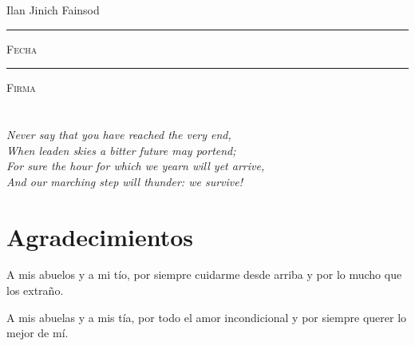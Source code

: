 \documentclass[11pt, oneside]{book}
\begin{document}
\centering

\hspace{3em}

Ilan Jinich Fainsod

\vspace{5em}

\rule[1em]{20em}{0.5pt} %

\textsc{Fecha}
 
\vspace{8em}

\rule[1em]{20em}{0.5pt} %

\textsc{Firma}

\endgroup
\vspace*{\fill}



\pagestyle{empty}
\frontmatter

\chapter*{}
\begin{flushright}
\textit{ Never say that you have reached the very end, \\
When leaden skies a bitter future may portend; \\
For sure the hour for which we yearn will yet arrive, \\
And our marching step will thunder: we survive!}
\end{flushright}



\chapter*{Agradecimientos}
%
A mis abuelos y a mi tío, por siempre cuidarme desde arriba y por lo mucho que los extraño.

A mis abuelas y a mis tía, por todo el amor incondicional y por siempre querer lo mejor de mí.
\end{document}
